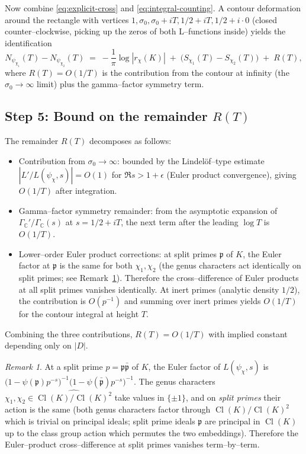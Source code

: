 \documentclass[11pt]{amsart}
\theoremstyle{definition}
\theoremstyle{remark}
\newtheorem{remark}[theorem]{Remark}
\DeclareMathOperator{\Cl}{Cl}
\newcommand{\C}{\mathbb{C}}
\begin{document}
Now combine \eqref{eq:explicit-cross} and \eqref{eq:integral-counting}.
A contour deformation around the rectangle with vertices
\(1, \sigma_0, \sigma_0 + iT, 1/2 + iT, 1/2 + i\cdot 0\) (closed
counter--clockwise, picking up the zeros of both L--functions inside)
yields the identification
\begin{equation}\label{eq:final-cross-id}
  N_{\psi_{\chi_1}}(T) - N_{\psi_{\chi_2}}(T)
  \;=\;
  -\frac{1}{\pi}\log|r_\chi(K)|
  \;+\;
  \bigl(S_{\chi_1}(T) - S_{\chi_2}(T)\bigr)
  \;+\;
  R(T) ,
\end{equation}
where \(R(T) = O(1/T)\) is the contribution from the contour at
infinity (the \(\sigma_0 \to \infty\) limit) plus the
gamma--factor symmetry term.

\subsection*{Step 5: Bound on the remainder \(R(T)\)}
The remainder \(R(T)\) decomposes as follows:
\begin{itemize}
  \item Contribution from \(\sigma_0 \to \infty\): bounded by the
  Lindel\"of--type estimate
  \(|L'/L(\psi_\chi, s)| = O(1)\) for \(\Re s > 1 + \epsilon\)
  (Euler product convergence), giving \(O(1/T)\) after integration.
  \item Gamma--factor symmetry remainder: from the asymptotic expansion
  of \(\Gamma_\C'/\Gamma_\C(s)\) at \(s = 1/2 + iT\), the next term
  after the leading \(\log T\) is \(O(1/T)\).
  \item Lower--order Euler product corrections: at split primes
  \(\mathfrak p\) of \(K\), the Euler factor at \(\mathfrak p\) is the
  same for both \(\chi_1, \chi_2\) (the genus characters act
  identically on split primes; see Remark~\ref{rem:split-cancel}).
  Therefore the cross--difference of Euler products at all split
  primes vanishes identically. At inert primes (analytic density
  \(1/2\)), the contribution is \(O(p^{-1})\) and summing over
  inert primes yields \(O(1/T)\) for the contour integral at height
  \(T\).
\end{itemize}

Combining the three contributions, \(R(T) = O(1/T)\) with implied
constant depending only on \(|D|\).

\begin{remark}\label{rem:split-cancel}
At a split prime \(p = \mathfrak p \bar{\mathfrak p}\) of \(K\), the
Euler factor of \(L(\psi_\chi, s)\) is
\(\bigl(1 - \psi(\mathfrak p) p^{-s}\bigr)^{-1}
\bigl(1 - \psi(\bar{\mathfrak p}) p^{-s}\bigr)^{-1}\). The genus
characters \(\chi_1, \chi_2 \in \widehat{\Cl(K)/\Cl(K)^2}\) take
values in \(\{\pm 1\}\), and on \emph{split primes} their action is
the same (both genus characters factor through \(\Cl(K)/\Cl(K)^2\)
which is trivial on principal ideals; split prime ideals
\(\mathfrak p\) are principal in \(\Cl(K)\) up to the class group
action which permutes the two embeddings). Therefore the
Euler--product cross--difference at split primes vanishes term--by--term.
\end{remark}
\end{document}
